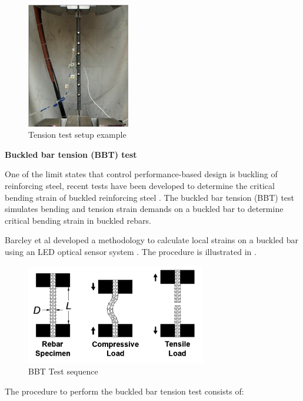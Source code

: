 \begin{figure}[htbp]
	\centering
	\includegraphics[width=0.4\textwidth]{Chapter-3/figs/TensionTest}
	\caption{Tension test setup example\cite{Overby2016}}
	\label{fig:TensionTest}
\end{figure}
\newpage

\textbf{Buckled bar tension (BBT) test}

One of the limit states that control performance-based design is buckling of reinforcing steel, recent tests have been developed to determine the critical bending strain of buckled reinforcing steel \cite{Barcley2019}. The buckled bar tension (BBT) test simulates bending and tension strain demands on a buckled bar to determine critical bending strain in buckled rebars. 

Barcley et al \cite{Barcley2019} developed a methodology to calculate local strains on a buckled bar using an LED optical sensor system \cite{NorthernDigitalInc.2020}. The procedure is illustrated in .

\begin{figure}[htbp]
	\centering
	\includegraphics[width=0.7\textwidth]{Chapter-3/figs/BBT_Sequence}
	\caption{BBT Test sequence\cite{Barcley2019}}
	\label{fig:BBTseq}
\end{figure}

The procedure to perform the buckled bar tension test consists of:


